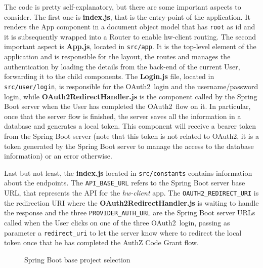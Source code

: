 \documentclass[a4paper,12pt]{article}
\def\oauth{OAuth2\xspace}
\begin{document}
The code is pretty self-explanatory, but there are some important aspects to consider. The first one is \textbf{index.js}, that is the entry-point of the application. It renders the App component in a document object model that has \texttt{root} as id and it is subsequently wrapped into a Router to enable hw-client routing. The second important aspect is \textbf{App.js}, located in \texttt{src/app}. It is the top-level element of the application and is responsible for the layout, the routes and manages the authentication by loading the details from the back-end of the current User, forwarding it to the child components. The \textbf{Login.js} file, located in \texttt{src/user/login}, is responsible for the \oauth\ login and the username/password login, while \textbf{OAuth2RedirectHandler.js} is the component called by the Spring Boot server when the User has completed the \oauth\ flow on it. In particular, once that the server flow is finished, the server saves all the information in a database and generates a local token. This component will receive a bearer token from the Spring Boot server (note that this token is not related to \oauth, it is a token generated by the Spring Boot server to manage the access to the database information) or an error otherwise.

Last but not least, the \textbf{index.js} located in \texttt{src/constants} contains information about the endpoints. The \texttt{\small API\_BASE\_URL} refers to the Spring Boot server base URL, that represents the API for the \textit{hw-client} app. The \texttt{\small OAUTH2\_REDIRECT\_URI} is the redirection URI where the \textbf{OAuth2RedirectHandler.js} is waiting to handle the response and the three \texttt{\small PROVIDER\_AUTH\_URL} are the Spring Boot server URLs called when the User clicks on one of the three \oauth\ login, passing as parameter a \texttt{redirect\_uri} to let the server know where to redirect the local token once that he has completed the AuthZ Code Grant flow. 

\begin{figure}[ht]
    \centering
    \caption{Spring Boot base project selection}
    \label{fig:spring}
\end{figure}
\end{document}
